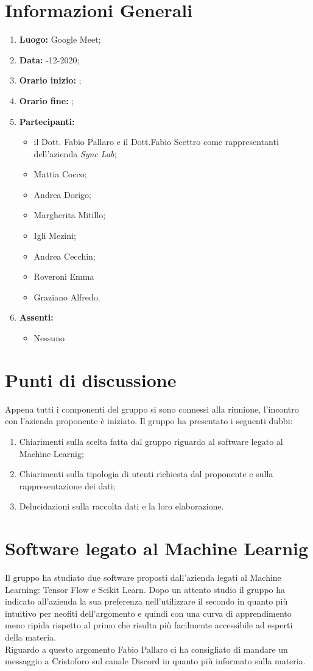 \newpage
\section{Informazioni Generali}
\begin{enumerate}
	\item \textbf{Luogo:} \normalfont Google Meet;
	\item \textbf{Data:} -12-2020;
	\item \textbf{Orario inizio:} ;
	\item \textbf{Orario fine:} ;
	\item \textbf{Partecipanti:}
	\begin{itemize}
		\item il Dott. Fabio Pallaro e il Dott.Fabio Scettro come rappresentanti dell'azienda \textit{Sync Lab};
		\item Mattia Cocco; 
		\item Andrea Dorigo;
		\item Margherita Mitillo;
		\item Igli Mezini;
		\item Andrea Cecchin;
		\item Roveroni Emma
		\item Graziano Alfredo.
	\end{itemize}
	\item \textbf{Assenti:}
	\begin{itemize}
		\item Nessuno
	\end{itemize}
\end{enumerate}
\section{Punti di discussione}
Appena tutti i componenti del gruppo si sono connessi alla riunione, l'incontro con l'azienda proponente è iniziato. Il gruppo ha presentato i seguenti dubbi:
\begin{enumerate}
	\item Chiarimenti sulla scelta fatta dal gruppo riguardo al software legato al Machine Learnig;
	\item Chiarimenti sulla tipologia di utenti richiesta dal proponente e sulla rappresentazione dei dati;
	\item Delucidazioni sulla raccolta dati e la loro elaborazione.
\end{enumerate}
\section{Software legato al Machine Learnig}
Il gruppo ha studiato due software proposti dall'azienda legati al Machine Learning: Tensor Flow e Scikit Learn.
Dopo un attento studio il gruppo ha indicato all'azienda la sua preferenza nell'utilizzare il secondo in quanto più intuitivo per neofiti dell'argomento e quindi con una curva di apprendimento meno ripida rispetto al primo che risulta più facilmente accessibile ad esperti della materia. \\
Riguardo a questo argomento Fabio Pallaro ci ha consigliato di mandare un messaggio a Cristoforo sul canale Discord in quanto più informato sulla materia.
